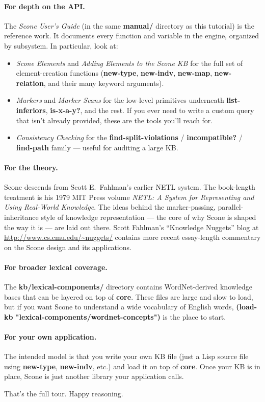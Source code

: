 \documentclass[titlepage,twoside,openright,11pt]{article}
\begin{document}
\paragraph{For depth on the API.}
The \emph{Scone User's Guide} (in the same \textbf{manual/}
directory as this tutorial) is the reference work. It documents
every function and variable in the engine, organized by subsystem.
In particular, look at:

\begin{itemize}
\item
  \emph{Scone Elements} and \emph{Adding Elements to the Scone KB}
  for the full set of element-creation functions (\textbf{new-type},
  \textbf{new-indv}, \textbf{new-map}, \textbf{new-relation}, and
  their many keyword arguments).
\item
  \emph{Markers} and \emph{Marker Scans} for the low-level
  primitives underneath \textbf{list-inferiors}, \textbf{is-x-a-y?},
  and the rest. If you ever need to write a custom query that
  isn't already provided, these are the tools you'll reach for.
\item
  \emph{Consistency Checking} for the \textbf{find-split-violations}
  / \textbf{incompatible?} / \textbf{find-path} family --- useful
  for auditing a large KB.
\end{itemize}

\paragraph{For the theory.}
Scone descends from Scott E.\ Fahlman's earlier NETL system. The
book-length treatment is his 1979 MIT Press volume \emph{NETL: A
System for Representing and Using Real-World Knowledge}. The ideas
behind the marker-passing, parallel-inheritance style of knowledge
representation --- the core of why Scone is shaped the way it is
--- are laid out there. Scott Fahlman's ``Knowledge Nuggets'' blog
at \url{http://www.cs.cmu.edu/~nuggets/} contains more recent
essay-length commentary on the Scone design and its applications.

\paragraph{For broader lexical coverage.}
The \textbf{kb/lexical-components/} directory contains WordNet-derived
knowledge bases that can be layered on top of \textbf{core}. These
files are large and slow to load, but if you want Scone to understand
a wide vocabulary of English words, \textbf{(load-kb
"lexical-components/wordnet-concepts")} is the place to start.

\paragraph{For your own application.}
The intended model is that you write your own KB file (just a Lisp
source file using \textbf{new-type}, \textbf{new-indv}, etc.)
and load it on top of \textbf{core}. Once your KB is in place,
Scone is just another library your application calls.

That's the full tour. Happy reasoning.
\end{document}
